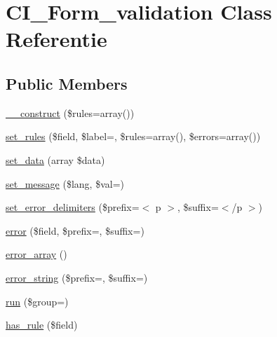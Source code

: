 \hypertarget{class_c_i___form__validation}{}\section{C\+I\+\_\+\+Form\+\_\+validation Class Referentie}
\label{class_c_i___form__validation}
\subsection*{Public Members}
\begin{DoxyCompactItemize}
\item 
\mbox{\hyperlink{class_c_i___form__validation_ac7224a1f92da249b312d1400c459ba83}{\+\_\+\+\_\+construct}} (\$rules=array())
\item 
\mbox{\hyperlink{class_c_i___form__validation_a7583f6c0643a979fbc5734c7b6e9fbe9}{set\+\_\+rules}} (\$field, \$label=\textquotesingle{}\textquotesingle{}, \$rules=array(), \$errors=array())
\item 
\mbox{\hyperlink{class_c_i___form__validation_af211c000380b8b345c6eb102cb5ca453}{set\+\_\+data}} (array \$data)
\item 
\mbox{\hyperlink{class_c_i___form__validation_a5a0dc4d3aef1f228155320a1d5275895}{set\+\_\+message}} (\$lang, \$val=\textquotesingle{}\textquotesingle{})
\item 
\mbox{\hyperlink{class_c_i___form__validation_ac45ddc321a1c1e5d5aad6e11f1f29b9c}{set\+\_\+error\+\_\+delimiters}} (\$prefix=\textquotesingle{}$<$ p $>$\textquotesingle{}, \$suffix=\textquotesingle{}$<$/p $>$\textquotesingle{})
\item 
\mbox{\hyperlink{class_c_i___form__validation_ae249cb0a67da61052921cf2880876cc1}{error}} (\$field, \$prefix=\textquotesingle{}\textquotesingle{}, \$suffix=\textquotesingle{}\textquotesingle{})
\item 
\mbox{\hyperlink{class_c_i___form__validation_a477a3b8cbc925367d5b6880c48a9b42a}{error\+\_\+array}} ()
\item 
\mbox{\hyperlink{class_c_i___form__validation_a63271bfb23c2963bed80f44fe9c27b09}{error\+\_\+string}} (\$prefix=\textquotesingle{}\textquotesingle{}, \$suffix=\textquotesingle{}\textquotesingle{})
\item 
\mbox{\hyperlink{class_c_i___form__validation_a304567453dbe1809dc0dc3ad99918383}{run}} (\$group=\textquotesingle{}\textquotesingle{})
\item 
\mbox{\hyperlink{class_c_i___form__validation_aaf0ef71d3e9ac390f52441f27e4b7786}{has\+\_\+rule}} (\$field)

\end{DoxyCompactItemize}
